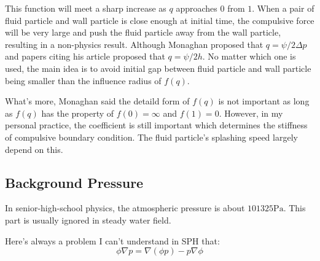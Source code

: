 This function will meet a sharp increase as $q$ approaches $0$ from $1$.
When a pair of fluid particle and wall particle is close enough at initial time,
the compulsive force will be very large and push the fluid particle away from the wall particle,
resulting in a non-physics result.
Although Monaghan proposed that $q=\psi/2\Delta p$ and papers citing his article 
proposed that $q=\psi/2h$.
No matter which one is used,
the main idea is to avoid initial gap between fluid particle and wall particle being smaller 
than the influence radius of $f(q)$.
\begin{figure}[H]
    \centering
\end{figure}

What's more, 
Monaghan said the detaild form of $f(q)$ is not important as long as 
$f(q)$ has the property of $f(0)=\infty$ and $f(1)=0$.
However, in my personal practice,
the coefficient is still important which determines the stiffness of compulsive boundary condition.
The fluid particle's splashing speed largely depend on this.

\subsection{Background Pressure}

In senior-high-school physics,
the atmospheric pressure is about $101325\mathrm{Pa}$.
This part is usually ignored in steady water field.

Here's always a problem I can't understand in SPH that:
\begin{equation}
    \phi\nabla p = \nabla (\phi p) - p\nabla \phi
\end{equation}

